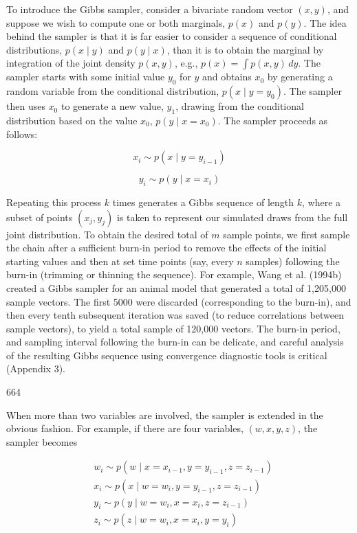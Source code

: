 \documentclass{article}
\begin{document}
To introduce the Gibbs sampler, consider a bivariate random vector  $ (x, y) $, and suppose we wish to compute one or both marginals,  $ p(x) $ and  $ p(y) $. The idea behind the sampler is that it is far easier to consider a sequence of conditional distributions,  $ p(x \mid y) $ and  $ p(y \mid x) $, than it is to obtain the marginal by integration of the joint density  $ p(x, y) $, e.g.,  $ p(x) = \int p(x, y) \, dy $. The sampler starts with some initial value  $ y_0 $ for  $ y $ and obtains  $ x_0 $ by generating a random variable from the conditional distribution,  $ p(x \mid y = y_0) $. The sampler then uses  $ x_0 $ to generate a new value,  $ y_1 $, drawing from the conditional distribution based on the value  $ x_0 $,  $ p(y \mid x = x_0) $. The sampler proceeds as follows:

\begin{equation}
x_{i}\sim p(x\mid y=y_{i-1})
\tag{19.31a}
\label{eq:19_31a}
\end{equation}

\begin{equation}
y_{i}\sim p(y\mid x=x_{i})
\tag{19.31b}
\label{eq:19_31b}
\end{equation}

Repeating this process $k$ times generates a Gibbs sequence of length $k$, where a subset of points $(x_j, y_j)$ is taken to represent our simulated draws from the full joint distribution. To obtain the desired total of $m$ sample points, we first sample the chain after a sufficient burn-in period to remove the effects of the initial starting values and then at set time points (say, every $n$ samples) following the burn-in (trimming or thinning the sequence). For example, Wang et al. (1994b) created a Gibbs sampler for an animal model that generated a total of 1,205,000 sample vectors. The first 5000 were discarded (corresponding to the burn-in), and then every tenth subsequent iteration was saved (to reduce correlations between sample vectors), to yield a total sample of 120,000 vectors. The burn-in period, and sampling interval following the burn-in can be delicate, and careful analysis of the resulting Gibbs sequence using convergence diagnostic tools is critical (Appendix 3).

664

When more than two variables are involved, the sampler is extended in the obvious fashion. For example, if there are four variables,  $ (w, x, y, z) $, the sampler becomes

\begin{equation}
\begin{aligned}&w_{i}\sim p(w\mid x=x_{i-1},y=y_{i-1},z=z_{i-1})\\&x_{i}\sim p(x\mid w=w_{i},y=y_{i-1},z=z_{i-1})\\&y_{i}\sim p(y\mid w=w_{i},x=x_{i},z=z_{i-1})\\&z_{i}\sim p(z\mid w=w_{i},x=x_{i},y=y_{i})\\ \end{aligned}
\end{equation}
\end{document}
